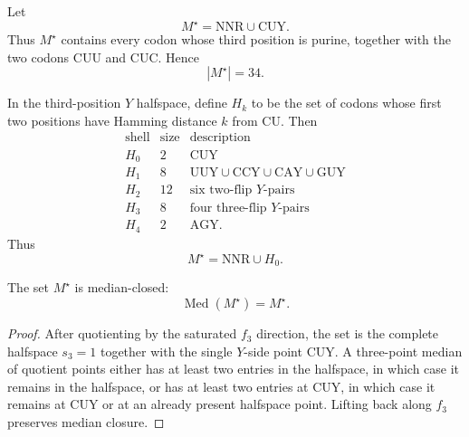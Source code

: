\begin{definition}
\label{def:philosophy-radial-shell-closure-beyond-gate-shell}
Let
$$
  M^{\star}=\mathrm{NNR}\cup\mathrm{CUY}.
$$
Thus $M^{\star}$ contains every codon whose third position is purine,
together with the two codons $\mathrm{CUU}$ and $\mathrm{CUC}$. Hence
$$
  |M^{\star}|=34.
$$
\end{definition}

\begin{definition}
\label{def:philosophy-y-halfspace-shells-around-cuy}
In the third-position $Y$ halfspace, define $H_{k}$ to be the set of
codons whose first two positions have Hamming distance $k$ from
$\mathrm{CU}$. Then
$$
\begin{array}{c|r|l}
  \text{shell} & \text{size} & \text{description}\\
  \hline
  H_{0} & 2 & \mathrm{CUY}\\
  H_{1} & 8 & \mathrm{UUY}\cup\mathrm{CCY}\cup\mathrm{CAY}\cup\mathrm{GUY}\\
  H_{2} & 12 & \text{six two-flip }Y\text{-pairs}\\
  H_{3} & 8 & \text{four three-flip }Y\text{-pairs}\\
  H_{4} & 2 & \mathrm{AGY}.
\end{array}
$$
Thus
$$
  M^{\star}=\mathrm{NNR}\cup H_{0}.
$$
\end{definition}

\begin{theorem}
\label{thm:philosophy-mstar-median-closed}
The set $M^{\star}$ is median-closed:
$$
  \operatorname{Med}(M^{\star})=M^{\star}.
$$
\end{theorem}
\begin{proof}
After quotienting by the saturated $f_{3}$ direction, the set is the
complete halfspace $s_{3}=1$ together with the single $Y$-side point
$\mathrm{CUY}$. A three-point median of quotient points either has at
least two entries in the halfspace, in which case it remains in the
halfspace, or has at least two entries at $\mathrm{CUY}$, in which case
it remains at $\mathrm{CUY}$ or at an already present halfspace point.
Lifting back along $f_{3}$ preserves median closure.
\end{proof}

